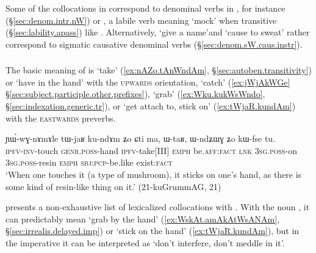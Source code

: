 Some of the collocations in  correspond to denominal verbs in , for instance  (§\ref{sec:denom.intr.nW}) or , a labile verb meaning `mock' when transitive (§\ref{sec:lability.apass}) like . Alternatively,  `give a name'and  `cause to sweat' rather correspond to sigmatic causative denominal verbs (§\ref{sec:denom.sW.caus.instr}).


\subsubsection{ } \label{sec:ndo.lv}
The basic meaning of  is `take' (\ref{ex:nAZo.tAnWndAm}, §\ref{sec:autoben.transitivity}) or `have in the hand' with the \textsc{upwards} orientation, `catch' (\ref{ex:jWjAkWGe} §\ref{sec:subject.participle.other.prefixes}), `grab' (\ref{ex:Wku.kukWsWndo}, §\ref{sec:indexation.generic.tr}), or  `get attach to, stick on' (\ref{ex:tWjaR.kundAm}) with the \textsc{eastwards} preverbs.  
  
\begin{exe}
\ex \label{ex:tWjaR.kundAm}
\gll ɲɯ́-wɣ-nɤmɤle tɯ-jaʁ ku-ndɤm ʑo ɕti ma, ɯ-taʁ, ɯ-ndʑɯɣ ʑo kɯ-fse tu. \\
\textsc{ipfv}-\textsc{inv}-touch \textsc{genr}.\textsc{poss}-hand \textsc{ipfv}-take[III] \textsc{emph} be.\textsc{aff}:\textsc{fact} \textsc{lnk} \textsc{3sg}.\textsc{poss}-on \textsc{3sg}.\textsc{poss}-resin \textsc{emph} \textsc{sbj}:\textsc{pcp}-be.like exist:\textsc{fact} \\
\glt `When one touches it (a type of mushroom), it sticks on one's hand, as there is some kind of resin-like thing on it.' (21-kuGrummAG, 21)
\end{exe}

 presents a non-exhaustive list of lexicalized collocations with . With the noun , it can predictably mean `grab by the hand' (\ref{ex:WskAt.amAkAtWsANAm}, §\ref{sec:irrealis.delayed.imp}) or `stick on the hand' (\ref{ex:tWjaR.kundAm}), but in the imperative it can be interpreted as `don't interfere, don't meddle in it'.

